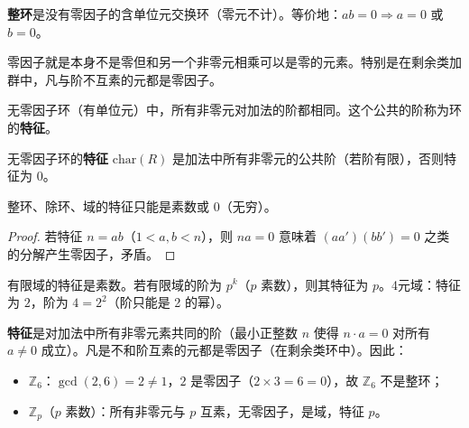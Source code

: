 \begin{definition}[整环（定义 2.18）]
\textbf{整环}是没有零因子的含单位元交换环（零元不计）。等价地：$ab = 0 \Rightarrow a = 0$ 或 $b = 0$。
\end{definition}

\begin{note}
零因子就是本身不是零但和另一个非零元相乘可以是零的元素。特别是在剩余类加群中，凡与阶不互素的元都是零因子。
\end{note}

\begin{theorem}[定理 1：无零因子环的特征]
无零因子环（有单位元）中，所有非零元对加法的阶都相同。这个公共的阶称为环的\textbf{特征}。
\end{theorem}

\begin{definition}[环的特征]
无零因子环的\textbf{特征} $\mathrm{char}(R)$ 是加法中所有非零元的公共阶（若阶有限），否则特征为 $0$。
\end{definition}

\begin{theorem}[定理 2：整环/除环/域的特征]
整环、除环、域的特征只能是素数或 $0$（无穷）。
\end{theorem}

\begin{proof}
若特征 $n = ab$（$1 < a, b < n$），则 $na = 0$ 意味着 $(aa')(bb') = 0$ 之类的分解产生零因子，矛盾。
\end{proof}

\begin{definition}[4元群与域的特征]
有限域的特征是素数。若有限域的阶为 $p^k$（$p$ 素数），则其特征为 $p$。4元域：特征为 $2$，阶为 $4 = 2^2$（阶只能是 2 的幂）。
\end{definition}

\begin{note}[特征的等价定义]
\textbf{特征}是对加法中所有非零元素共同的阶（最小正整数 $n$ 使得 $n \cdot a = 0$ 对所有 $a \ne 0$ 成立）。凡是不和阶互素的元都是零因子（在剩余类环中）。因此：
\begin{itemize}
  \item $\mathbb{Z}_6$：$\gcd(2, 6) = 2 \ne 1$，$2$ 是零因子（$2 \times 3 = 6 = 0$），故 $\mathbb{Z}_6$ 不是整环；
  \item $\mathbb{Z}_p$（$p$ 素数）：所有非零元与 $p$ 互素，无零因子，是域，特征 $p$。
\end{itemize}
\end{note}

